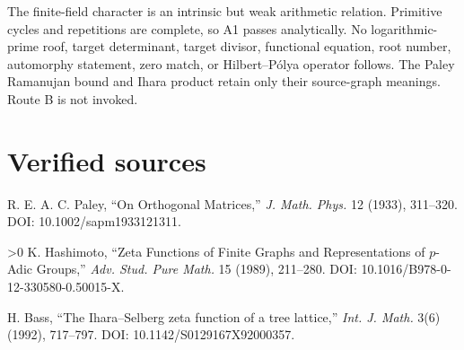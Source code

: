 \documentclass[10pt]{article}
\providecommand{\CRevisionRound}{2}
\begin{document}
The finite-field character is an intrinsic but weak arithmetic relation.
Primitive cycles and repetitions are complete, so A1 passes analytically.
No logarithmic-prime roof, target determinant, target divisor, functional
equation, root number, automorphy statement, zero match, or Hilbert--P\'olya
operator follows.  The Paley Ramanujan bound and Ihara product retain only
their source-graph meanings.  Route B is not invoked.
\fi

\section*{Verified sources}
\footnotesize
\noindent[1] R. E. A. C. Paley, ``On Orthogonal Matrices,'' \emph{J. Math.
Phys.} 12 (1933), 311--320. DOI: 10.1002/sapm1933121311.\par
\ifnum\CRevisionRound>0
\noindent[2] K. Hashimoto, ``Zeta Functions of Finite Graphs and
Representations of $p$-Adic Groups,'' \emph{Adv. Stud. Pure Math.} 15 (1989),
211--280. DOI: 10.1016/B978-0-12-330580-0.50015-X.\par
\noindent[3] H. Bass, ``The Ihara--Selberg zeta function of a tree lattice,''
\emph{Int. J. Math.} 3(6) (1992), 717--797.
DOI: 10.1142/S0129167X92000357.\par
\fi
\end{document}
